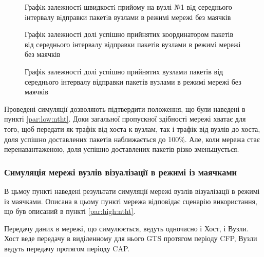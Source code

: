 \documentclass[a4paper,ukrainian,utf8,nocolumnsxix,floatsection,equationsection]{eskdtext}
\newcommand{\longcaption}[1]{\captionsetup{style=figureLongCaption}\caption{#1}}
\renewcommand\paragraph{\subsubsection}
\begin{document}
\begin{figure}[htbp]
	\centering
	\longcaption{\label{fig:result_test_backtraf_nobeac_brd_tp1}Графiк залежностi швидкостi прийому на вузлі №1 вiд середнього iнтервалу вiдправки пакетiв вузлами в режимі мережі без маячків}
\end{figure}

\begin{figure}[htbp]
	\centering
	\longcaption{\label{fig:result_test_backtraf_nobeac_brd_succ_rate}Графік залежності долі успішно прийнятих координатором пакетів від середнього інтервалу відправки пакетів вузлами в режимі мережі без маячків}
\end{figure}

\begin{figure}[htbp]
	\centering
	\longcaption{\label{fig:result_test_backtraf_nobeac_brd_deliv}Графік залежності долі успішно прийнятих вузлами пакетів від середнього інтервалу відправки пакетів вузлами в режимі мережі без маячків}
\end{figure}


Проведені симуляції дозволяють підтвердити положення, що були наведені в пункті \ref{par:low:ntht}. Доки загальної пропускної здібності мережі хватає для того, щоб передати як трафік від хоста к вузлам, так і трафік від вузлів до хоста, доля успішно доставлених пакетів наближається до 100\%. Але, коли мережа стає перенавантаженою, доля успішно доставлених пакетів різко зменьшується. 


\paragraph{Симуляція мережі вузлів візуалізації в режимі із маячками}
\label{par:simulation_backtraf_beac}

В цьмоу пункті наведені результати симуляції мережі вузлів візуалізації в режимі із маячками. Описана в цьому пункті мережа відповідає сценарію використання, що був описаний в пункті \ref{par:high:ntht}.

Передачу даних в мережі, що симулюється, ведуть одночасно і Хост, і Вузли. Хост веде передачу в виділенному для нього GTS протягом періоду CFP, Вузли ведуть передачу протягом періоду CAP. 
\end{document}
